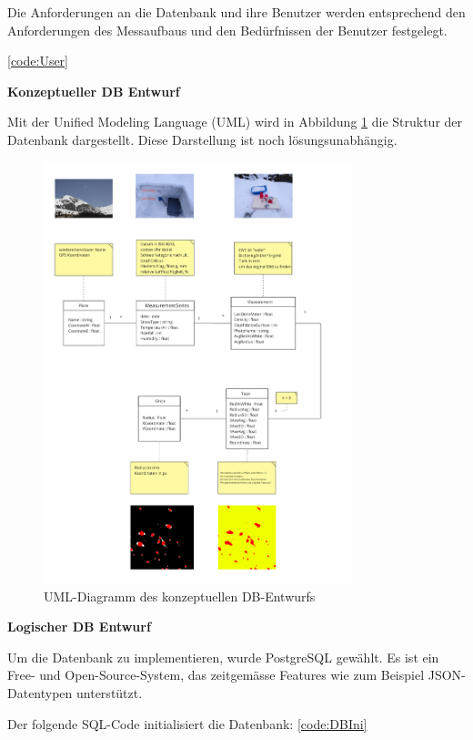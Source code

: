 Die Anforderungen an die Datenbank und ihre Benutzer werden entsprechend den Anforderungen des Messaufbaus und den Bedürfnissen der Benutzer festgelegt.

\ref{code:User}

\textbf{Konzeptueller DB Entwurf}

Mit der Unified Modeling Language (UML) wird in Abbildung \ref{fig:uml-db-entwurf} die Struktur der Datenbank dargestellt. Diese Darstellung ist noch lösungsunabhängig.

\begin{figure}
    \centering
    \includegraphics[width=0.8\textwidth]{Bilder/Screenshotfrom2024-04-1418-05-35.png}
    \caption{UML-Diagramm des konzeptuellen DB-Entwurfs}
    \label{fig:uml-db-entwurf}
\end{figure}



\textbf{Logischer DB Entwurf}


Um die Datenbank zu implementieren, wurde PostgreSQL gewählt. Es ist ein Free- und Open-Source-System, das zeitgemässe Features wie zum Beispiel JSON-Datentypen unterstützt.

Der folgende SQL-Code initialisiert die Datenbank: \ref{code:DBIni}

